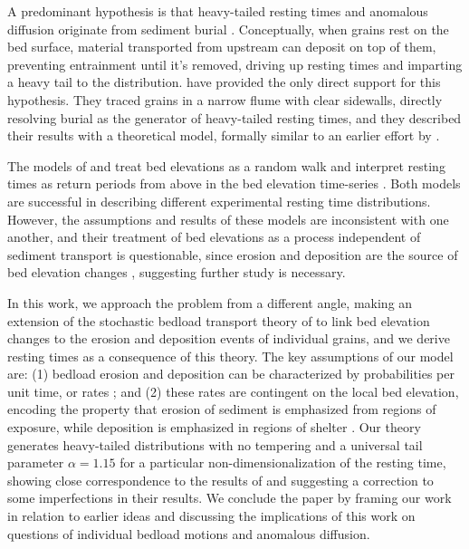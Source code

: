 \documentclass[draft]{agujournal2018}
\begin{document}
A predominant hypothesis is that heavy-tailed resting times and anomalous diffusion originate from sediment burial \citep{Voepel2013,Martin2014,Wu2019}.
Conceptually, when grains rest on the bed surface, material transported from upstream can deposit on top of them, preventing entrainment until it's removed, driving up resting times and imparting a heavy tail to the distribution.
\citet{Martin2014} have provided the only direct support for this hypothesis.
They traced grains in a narrow flume with clear sidewalls, directly resolving burial as the generator of heavy-tailed resting times, and they described their results with a theoretical model, formally similar to an earlier effort by \citet{Voepel2013}.

The models of \citet{Voepel2013} and \citet{Martin2014} treat bed elevations as a random walk and interpret resting times as return periods from above in the bed elevation time-series \citep[e.g.][]{Redner2007}.
Both models are successful in describing different experimental resting time distributions.
However, the assumptions and results of these models are inconsistent with one another, and their treatment of bed elevations as a process independent of sediment transport is questionable, since erosion and deposition are the source of bed elevation changes \citep[e.g.][]{Wong2007}, suggesting further study is necessary.

In this work, we approach the problem from a different angle, making an extension of the stochastic bedload transport theory of \citet{Ancey2008} to link bed elevation changes to the erosion and deposition events of individual grains, and we derive resting times as a consequence of this theory.
The key assumptions of our model are: (1) bedload erosion and deposition can be characterized by probabilities per unit time, or rates \citep[e.g.][]{Einstein1950, Ancey2008}; and (2) these rates are contingent on the local bed elevation, encoding the property that erosion of sediment is emphasized from regions of exposure, while deposition is emphasized in regions of shelter \citep[e.g.][]{Sawai1987, Wong2007}.
Our theory generates heavy-tailed distributions with no tempering and a universal tail parameter $\alpha = 1.15$ for a particular non-dimensionalization of the resting time, showing close correspondence to the results of \citet{Martin2014} and suggesting a correction to some imperfections in their results.
We conclude the paper by framing our work in relation to earlier ideas and discussing the implications of this work on questions of individual bedload motions and anomalous diffusion.
\end{document}
